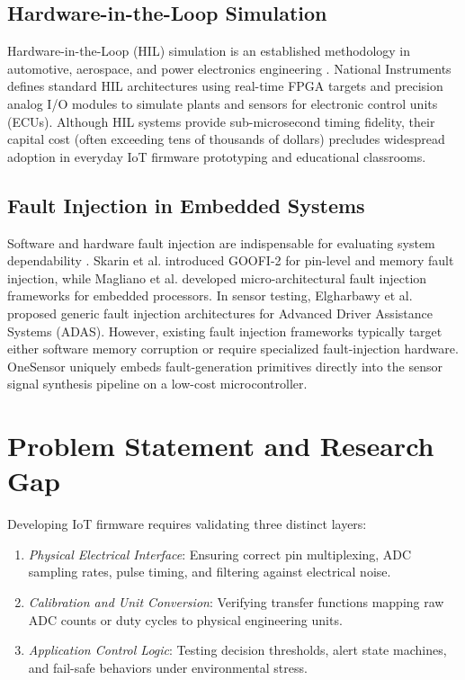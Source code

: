 \documentclass[conference]{IEEEtran}
\begin{document}
\subsection{Hardware-in-the-Loop Simulation}
Hardware-in-the-Loop (HIL) simulation is an established methodology in automotive, aerospace, and power electronics engineering \cite{fathy2006review, abdalla2014framework}. National Instruments \cite{ni_hil_whitepaper} defines standard HIL architectures using real-time FPGA targets and precision analog I/O modules to simulate plants and sensors for electronic control units (ECUs). Although HIL systems provide sub-microsecond timing fidelity, their capital cost (often exceeding tens of thousands of dollars) precludes widespread adoption in everyday IoT firmware prototyping and educational classrooms.

\subsection{Fault Injection in Embedded Systems}
Software and hardware fault injection are indispensable for evaluating system dependability \cite{natella2016assessing}. Skarin et al. \cite{skarin2010goofi} introduced GOOFI-2 for pin-level and memory fault injection, while Magliano et al. \cite{magliano2025real} developed micro-architectural fault injection frameworks for embedded processors. In sensor testing, Elgharbawy et al. \cite{elgharbawy2016generic} proposed generic fault injection architectures for Advanced Driver Assistance Systems (ADAS). However, existing fault injection frameworks typically target either software memory corruption or require specialized fault-injection hardware. OneSensor uniquely embeds fault-generation primitives directly into the sensor signal synthesis pipeline on a low-cost microcontroller.

\section{Problem Statement and Research Gap}
Developing IoT firmware requires validating three distinct layers:
\begin{enumerate}
    \item \textit{Physical Electrical Interface}: Ensuring correct pin multiplexing, ADC sampling rates, pulse timing, and filtering against electrical noise.
    \item \textit{Calibration and Unit Conversion}: Verifying transfer functions mapping raw ADC counts or duty cycles to physical engineering units.
    \item \textit{Application Control Logic}: Testing decision thresholds, alert state machines, and fail-safe behaviors under environmental stress.
\end{enumerate}
\end{document}
